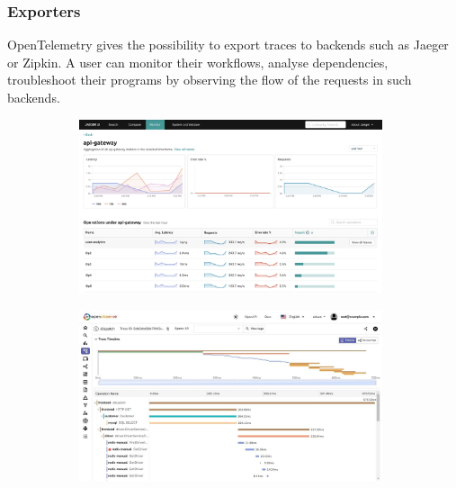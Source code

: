     \subsubsection{Exporters}
            OpenTelemetry gives the possibility to export traces to backends such as Jaeger or Zipkin. A user can monitor their workflows, analyse dependencies, troubleshoot their programs by observing the flow of the requests in such backends. \cite{jg}
       \begin{figure}[H]
            \centering
            \begin{subfigure}{.5\textwidth}
                \centering
                \includegraphics[width=0.98\textwidth]{img/jaeger.png}
                \label{fig:sub1}
            \end{subfigure}%
            \begin{subfigure}{.5\textwidth}
                \centering
                \includegraphics[width =0.98\textwidth]{img/jaeger2.jpg}
                \label{fig:sub2}
            \end{subfigure}
            \label{fig:test}
            \end{figure}


